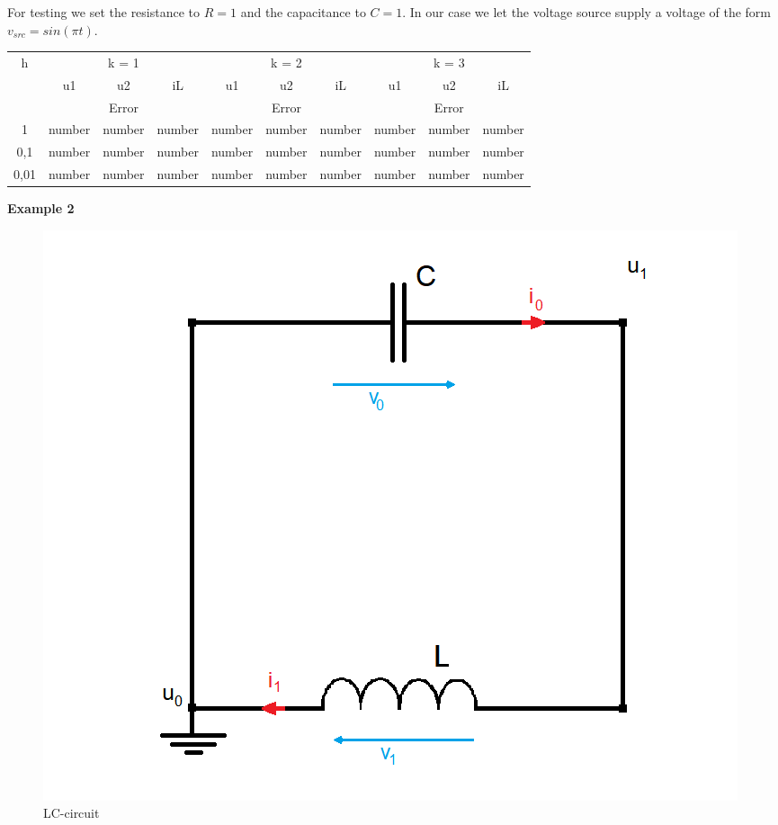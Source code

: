 	For testing we set the resistance to $R=1$ and the capacitance to $C=1$. In our case we let the  voltage source supply a voltage of the form $v_{src} = sin(\pi t)$.
	
	\begin{center}
		\begin{tabular}{ c || c c c | c c c | c c c | } 
			h & \multicolumn{3}{c|}{k = 1} & \multicolumn{3}{c|}{k = 2} & \multicolumn{3}{c|}{k = 3} \\
			 & u1 & u2 & iL & u1 & u2 & iL & u1 & u2 & iL \\
			\hline
			 & \multicolumn{3}{c|}{Error} & \multicolumn{3}{c|}{Error} & \multicolumn{3}{c|}{Error} \\
			\hline
			1 & number & number & number & number & number & number & number & number & number \\
			0,1 & number & number & number & number & number & number & number & number & number \\
			0,01 & number & number & number & number & number & number & number & number & number
		\end{tabular}
	\end{center}


	\textbf{Example 2} \\
	
	\begin{figure}[H]
		\centering
		\includegraphics[scale=0.4]{pictures/Example2_index0.png}
		\caption{LC-circuit}
	\end{figure}

